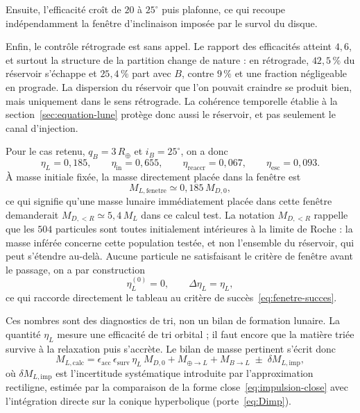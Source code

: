 \documentclass[11pt,a4paper,openany]{report}
\newcommand{\Rt}{R_{\oplus}}
\begin{document}
Ensuite, l'efficacité croît de $20$ à $25^\circ$ puis plafonne, ce qui recoupe indépendamment la
fenêtre d'inclinaison imposée par le survol du disque.

Enfin, le contrôle rétrograde est sans appel. Le rapport des efficacités atteint $4{,}6$, et
surtout la structure de la partition change de nature : en rétrograde, $42{,}5\,\%$ du réservoir
s'échappe et $25{,}4\,\%$ part avec $B$, contre $9\,\%$ et une fraction négligeable en prograde. La
dispersion du réservoir que l'on pouvait craindre se produit bien, mais uniquement dans le sens
rétrograde. La cohérence temporelle établie à la section~\ref{sec:equation-lune} protège donc aussi
le réservoir, et pas seulement le canal d'injection.

Pour le cas retenu, $q_B=3\,\Rt$ et $i_B=25^\circ$, on a donc
\begin{equation}
\eta_L=0{,}185,\qquad \eta_{\mathrm{in}}=0{,}655,\qquad
\eta_{\mathrm{reaccr}}=0{,}067,\qquad \eta_{\mathrm{esc}}=0{,}093 .
\label{eq:pilote-cas}
\end{equation}
À masse initiale fixée, la masse directement placée dans la fenêtre est
\begin{equation}
M_{L,\mathrm{fenetre}}\simeq0{,}185\,M_{D,0},
\label{eq:MLfenetre}
\end{equation}
ce qui signifie qu'une masse lunaire immédiatement placée dans cette fenêtre demanderait
$M_{D,<R}\simeq5{,}4\,M_L$ dans ce calcul test. La notation $M_{D,<R}$ rappelle que les $504$
particules sont toutes initialement intérieures à la limite de Roche : la masse inférée concerne
cette population testée, et non l'ensemble du réservoir, qui peut s'étendre au-delà. Aucune
particule ne satisfaisant le critère de fenêtre avant le passage, on a par construction
\begin{equation}
\eta_L^{(0)}=0,\qquad \Delta\eta_L=\eta_L,
\label{eq:deltaetaL}
\end{equation}
ce qui raccorde directement le tableau au critère de succès~\eqref{eq:fenetre-succes}.

Ces nombres sont des diagnostics de tri, non un bilan de formation lunaire. La quantité $\eta_L$
mesure une efficacité de tri orbital ; il faut encore que la matière triée survive à la relaxation
puis s'accrète. Le bilan de masse pertinent s'écrit donc
\begin{equation}
\boxed{\;
M_{L,\mathrm{calc}}=
\epsilon_{\mathrm{acc}}\,\epsilon_{\mathrm{surv}}\,\eta_L\,M_{D,0}
+M_{\oplus\to L}+M_{B\to L}
\;\pm\;\delta M_{L,\mathrm{imp}},
\;}
\label{eq:MLcalc-eff}
\end{equation}
où $\delta M_{L,\mathrm{imp}}$ est l'incertitude systématique introduite par l'approximation
rectiligne, estimée par la comparaison de la forme close~\eqref{eq:impulsion-close} avec
l'intégration directe sur la conique hyperbolique (porte~\eqref{eq:Dimp}).
\end{document}
